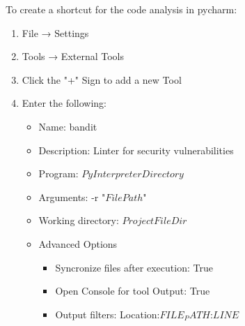 To create a shortcut for the code analysis in pycharm:

\begin{enumerate}
    \item File → Settings
    \item Tools → External Tools
    \item Click the "+" Sign to add a new Tool
    \item Enter the following:
    \begin{itemize}
        \item Name: bandit
        \item Description: Linter for security vulnerabilities
        \item Program: $PyInterpreterDirectory$\bandit
        \item Arguments: -r "$FilePath$"
        \item Working directory: $ProjectFileDir$
        \item Advanced Options
        \begin{itemize}
            \item Syncronize files after execution: True
            \item Open Console for tool Output: True
            \item Output filters: \s*Location:\s*$FILE_PATH$:\s*$LINE$
        \end{itemize}
    \end{itemize}
\end{enumerate}



